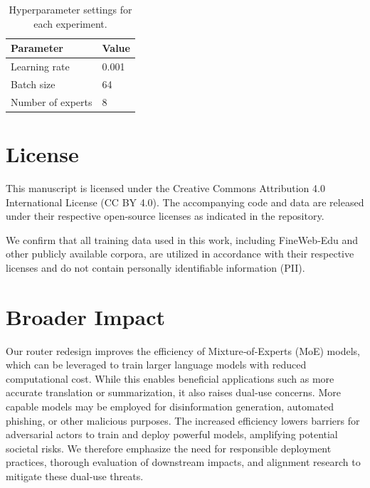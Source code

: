 \documentclass{llmxive}
\begin{document}
\begin{table}[!htbp]
\centering
\begin{tabular}{l l}
\toprule
Parameter & Value \\
\midrule
Learning rate & 0.001 \\
Batch size & 64 \\
Number of experts & 8 \\
\bottomrule
\end{tabular}
\caption{Hyperparameter settings for each experiment.}
\label{tab:hyperparams}
\end{table}

\section*{License}
This manuscript is licensed under the Creative Commons Attribution 4.0 International License (CC BY 4.0). The accompanying code and data are released under their respective open-source licenses as indicated in the repository.

We confirm that all training data used in this work, including FineWeb‑Edu and other publicly available corpora, are utilized in accordance with their respective licenses and do not contain personally identifiable information (PII).
\section{Broader Impact}
\label{sec:broader-impact}
Our router redesign improves the efficiency of Mixture‑of‑Experts (MoE) models, which can be leveraged to train larger language models with reduced computational cost. While this enables beneficial applications such as more accurate translation or summarization, it also raises dual‑use concerns. More capable models may be employed for disinformation generation, automated phishing, or other malicious purposes. The increased efficiency lowers barriers for adversarial actors to train and deploy powerful models, amplifying potential societal risks. We therefore emphasize the need for responsible deployment practices, thorough evaluation of downstream impacts, and alignment research to mitigate these dual‑use threats.
\end{document}
